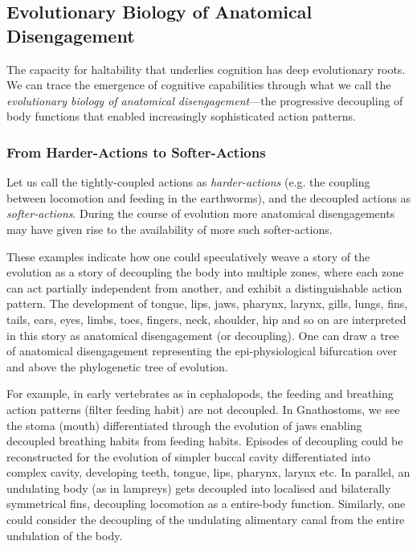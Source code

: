 \subsection{Evolutionary Biology of Anatomical Disengagement}
\label{subsec:evolutionary_disengagement}

The capacity for haltability that underlies cognition has deep evolutionary roots. We can trace the emergence of cognitive capabilities through what we call the \textit{evolutionary biology of anatomical disengagement}—the progressive decoupling of body functions that enabled increasingly sophisticated action patterns.

\subsubsection{From Harder-Actions to Softer-Actions}
Let us call the tightly-coupled actions as \textit{harder-actions} (e.g. the coupling between locomotion and feeding in the earthworms), and the decoupled actions as \textit{softer-actions}. During the course of evolution more anatomical disengagements may have given rise to the availability of more such softer-actions.

These examples indicate how one could speculatively weave a story of the evolution as a story of decoupling the body into multiple zones, where each zone can act partially independent from another, and exhibit a distinguishable action pattern. The development of tongue, lips, jaws, pharynx, larynx, gills, lungs, fins, tails, ears, eyes, limbs, toes, fingers, neck, shoulder, hip and so on are interpreted in this story as anatomical disengagement (or decoupling). One can draw a tree of anatomical disengagement representing the epi-physiological bifurcation over and above the phylogenetic tree of evolution.

For example, in early vertebrates as in cephalopods, the feeding and breathing action patterns (filter feeding habit) are not decoupled. In Gnathostoms, we see the stoma (mouth) differentiated through the evolution of jaws enabling decoupled breathing habits from feeding habits. Episodes of decoupling could be reconstructed for the evolution of simpler buccal cavity differentiated into complex cavity, developing teeth, tongue, lips, pharynx, larynx etc. In parallel, an undulating body (as in lampreys) gets decoupled into localised and bilaterally symmetrical fins, decoupling locomotion as a entire-body function. Similarly, one could consider the decoupling of the undulating alimentary canal from the entire undulation of the body.

